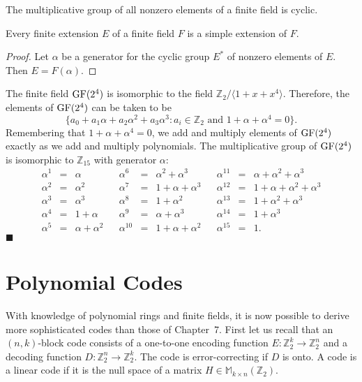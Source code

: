 \begin{corollary}
The multiplicative group of all nonzero elements of a finite field is cyclic. 
\end{corollary}

\begin{corollary}
Every finite extension $E$ of a finite field $F$ is a simple extension of $F$. 
\end{corollary}

\begin{proof}
Let $\alpha$ be a generator for the cyclic group $E^{\ast}$ of nonzero elements of $E$. Then $E = F( \alpha )$. 
\end{proof}
 
\medskip

The finite field ${\rm GF}(2^4)$ is isomorphic to the field ${\mathbb Z}_2/ \langle 1 + x + x^4 \rangle$. Therefore, the elements of  ${\rm GF}(2^4)$ can be taken to be
$$
\{
a_0 + a_1 \alpha + a_2 \alpha^2 + a_3 \alpha^3 : a_i \in {\mathbb Z}_2
\mbox{ and } 1 + \alpha + \alpha^4 = 0
\}.
$$
Remembering that $1 + \alpha +\alpha^4 = 0$, we add and multiply elements of ${\rm GF}(2^4)$ exactly as we add and multiply polynomials.  The multiplicative group of ${\rm GF}(2^4)$ is isomorphic to ${\mathbb  Z}_{15}$ with generator $\alpha$: 
$$
\begin{array}{rclcrclcrcl}
\alpha^1 & = & \alpha & &
\alpha^6  & = & \alpha^2 + \alpha^3 & &
\alpha^{11} & = & \alpha + \alpha^2 + \alpha^3 \\
\alpha^2 & = & \alpha^2 & &
\alpha^7  & = & 1 + \alpha + \alpha^3 & &
\alpha^{12} & = & 1 + \alpha + \alpha^2 + \alpha^3 \\
\alpha^3 & = & \alpha^3 & &
\alpha^8  & = & 1 + \alpha^2 & &
\alpha^{13} & = & 1 + \alpha^2 + \alpha^3 \\
\alpha^4 & = & 1 + \alpha & &
\alpha^9  & = & \alpha + \alpha^3 & &
\alpha^{14} & = & 1 + \alpha^3 \\
\alpha^5 & = & \alpha + \alpha^2 & &
\alpha^{10}  & = & 1 + \alpha + \alpha^2 & &
\alpha^{15} & = & 1. 
\end{array}
$$
\hspace{\fill} $\blacksquare$


\section{Polynomial Codes}

With knowledge of polynomial rings and finite fields, it is now possible to derive more sophisticated codes than those of Chapter~7.  First let us recall that an $(n, k)$-block code consists of a one-to-one encoding function $E:{\mathbb Z}^{k}_{2} \rightarrow {\mathbb Z}^{n}_{2}$ and a decoding function $D:{\mathbb Z}^{n}_{2} \rightarrow {\mathbb Z}^{k}_{2}$.  The code is error-correcting if $D$ is onto.  A code is a linear code if it is the null space of a matrix $H \in {\mathbb M}_{k \times n}({\mathbb Z}_2)$.  

